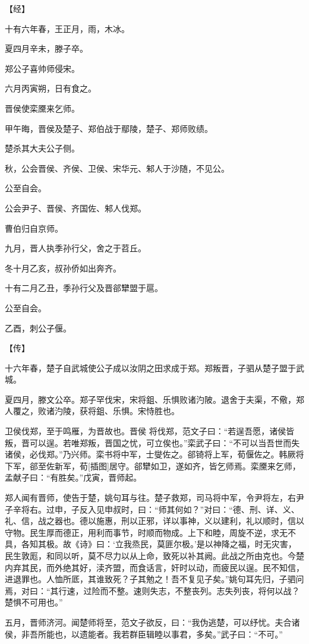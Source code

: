 \documentclass[a4paper,12pt,UTF8,twoside]{ctexbook}
\begin{document}
【经】

十有六年春，王正月，雨，木冰。

夏四月辛未，滕子卒。

郑公子喜帅师侵宋。

六月丙寅朔，日有食之。

晋侯使栾黡来乞师。

甲午晦，晋侯及楚子、郑伯战于鄢陵，楚子、郑师败绩。

楚杀其大夫公子侧。

秋，公会晋侯、齐侯、卫侯、宋华元、邾人于沙随，不见公。

公至自会。

公会尹子、晋侯、齐国佐、邾人伐郑。

曹伯归自京师。

九月，晋人执季孙行父，舍之于苕丘。

冬十月乙亥，叔孙侨如出奔齐。

十有二月乙丑，季孙行父及晋郤犫盟于扈。

公至自会。

乙酉，刺公子偃。

【传】

十六年春，楚子自武城使公子成以汝阴之田求成于郑。郑叛晋，子驷从楚子盟于武城。

夏四月，滕文公卒。郑子罕伐宋，宋将鉏、乐惧败诸汋陂。退舍于夫渠，不儆，郑人覆之，败诸汋陵，获将鉏、乐惧。宋恃胜也。

卫侯伐郑，至于鸣雁，为晋故也。晋侯 将伐郑，范文子曰：“若逞吾愿，诸侯皆叛，晋可以逞。若唯郑叛，晋国之忧，可立俟也。”栾武子曰：“不可以当吾世而失诸侯，必伐郑。”乃兴师。栾书将中军，士燮佐之。郤锜将上军，荀偃佐之。韩厥将下军，郤至佐新军，荀[插图]居守。郤犫如卫，遂如齐，皆乞师焉。栾黡来乞师，孟献子曰：“有胜矣。”戊寅，晋师起。

郑人闻有晋师，使告于楚，姚句耳与往。楚子救郑，司马将中军，令尹将左，右尹子辛将右。过申，子反入见申叔时，曰：“师其何如？”对曰：“德、刑、详、义、礼、信，战之器也。德以施惠，刑以正邪，详以事神，义以建利，礼以顺时，信以守物。民生厚而德正，用利而事节，时顺而物成。上下和睦，周旋不逆，求无不具，各知其极。故《诗》曰：‘立我烝民，莫匪尔极。’是以神降之福，时无灾害，民生敦厖，和同以听，莫不尽力以从上命，致死以补其阙。此战之所由克也。今楚内弃其民，而外绝其好，渎齐盟，而食话言，奸时以动，而疲民以逞。民不知信，进退罪也。人恤所厎，其谁致死？子其勉之！吾不复见子矣。”姚句耳先归，子驷问焉，对曰：“其行速，过险而不整。速则失志，不整丧列。志失列丧，将何以战？楚惧不可用也。”

五月，晋师济河。闻楚师将至，范文子欲反，曰：“我伪逃楚，可以纾忧。夫合诸侯，非吾所能也，以遗能者。我若群臣辑睦以事君，多矣。”武子曰：“不可。”
\end{document}
